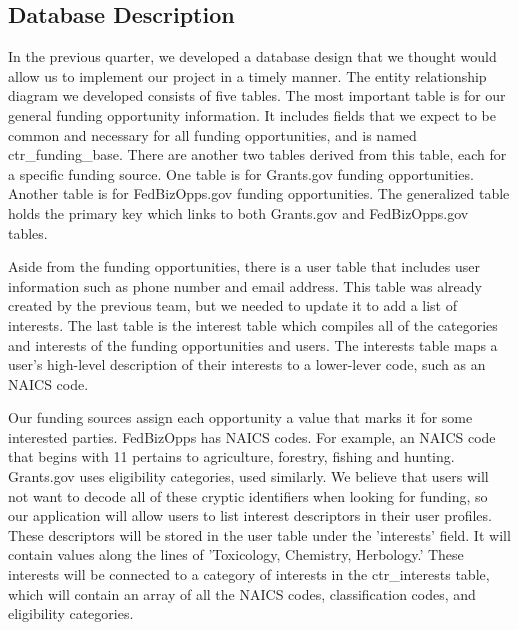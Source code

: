 \documentclass[onecolumn]{IEEEtran}
\begin{document}
\subsection{Database Description}
In the previous quarter, we developed a database design that we thought would allow us to implement our project in a timely manner. The entity relationship diagram we developed consists of five tables. The most important table is for our general funding opportunity information. It includes fields that we expect to be common and necessary for all funding opportunities, and is named ctr\_funding\_base. There are another two tables derived from this table, each for a specific funding source. One table is for Grants.gov funding opportunities. Another table is for FedBizOpps.gov funding opportunities. The generalized table holds the primary key which links to both Grants.gov and FedBizOpps.gov tables. 

Aside from the funding opportunities, there is a user table that includes user information such as phone number and email address. This table was already created by the previous team, but we needed to update it to add a list of interests. The last table is the interest table which compiles all of the categories and interests of the funding opportunities and users. The interests table maps a user's high-level description of their interests to a lower-lever code, such as an NAICS code.

Our funding sources assign each opportunity a value that marks it for some interested parties. FedBizOpps has NAICS codes. For example, an NAICS code that begins with 11 pertains to agriculture, forestry, fishing and hunting. Grants.gov uses eligibility categories, used similarly. We believe that users will not want to decode all of these cryptic identifiers when looking for funding, so our application will allow users to list interest descriptors in their user profiles. These descriptors will be stored in the user table under the 'interests' field. It will contain values along the lines of 'Toxicology, Chemistry, Herbology.' These interests will be connected to a category of interests in the ctr\_interests table, which will contain an array of all the NAICS codes, classification codes, and eligibility categories.
\end{document}
